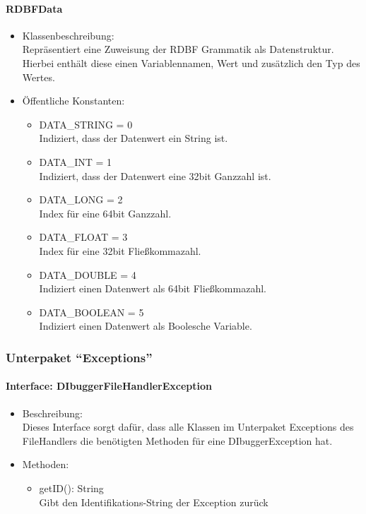 \documentclass[parskip=full]{scrartcl}
\begin{document}
\paragraph{RDBFData}
\begin{itemize}
\item Klassenbeschreibung: \\
Repräsentiert eine Zuweisung der RDBF Grammatik als Datenstruktur. Hierbei enthält diese einen Variablennamen, Wert und zusätzlich den Typ des Wertes.
\item Öffentliche Konstanten: \\
\begin{itemize}
\item DATA\_STRING = 0 \\
Indiziert, dass der Datenwert ein String ist.
\item DATA\_INT = 1 \\
Indiziert, dass der Datenwert eine 32bit Ganzzahl ist.
\item DATA\_LONG = 2 \\
Index für eine 64bit Ganzzahl.
\item DATA\_FLOAT = 3 \\
Index für eine 32bit Fließkommazahl.
\item DATA\_DOUBLE = 4 \\
Indiziert einen Datenwert als 64bit Fließkommazahl.
\item DATA\_BOOLEAN = 5 \\
Indiziert einen Datenwert als Boolesche Variable.
\end{itemize}
\end{itemize}

\subsubsection{Unterpaket \enquote{Exceptions}}

\paragraph{Interface: DIbuggerFileHandlerException}
\begin{itemize}
\item Beschreibung: \\
Dieses Interface sorgt dafür, dass alle Klassen im Unterpaket Exceptions des FileHandlers die benötigten Methoden für eine DIbuggerException hat.
\item Methoden: \\
\begin{itemize}
\item getID(): String \\
Gibt den Identifikations-String der Exception zurück
\end{itemize}
\end{itemize}
\end{document}

